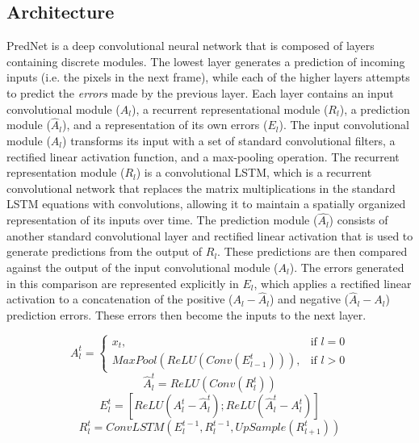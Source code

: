 \subsection{Architecture}

PredNet is a deep convolutional neural network that is composed of layers containing discrete modules. The lowest layer generates a prediction of incoming inputs (i.e. the pixels in the next frame), while each of the higher layers attempts to predict the {\em errors} made by the previous layer. Each layer contains an input convolutional module ($A_l$), a recurrent representational module ($R_l$), a prediction module ($\hat{A}_l$), and a representation of its own errors ($E_l$). The input convolutional module ($A_l$) transforms its input with a set of standard convolutional filters, a rectified linear activation function, and a max-pooling operation. The recurrent representation module ($R_l$) is a convolutional LSTM, which is a recurrent convolutional network that replaces the matrix multiplications in the standard LSTM equations with convolutions, allowing it to maintain a spatially organized representation of its inputs over time. The prediction module ($\hat{A_l}$) consists of another standard convolutional layer and rectified linear activation that is used to generate predictions from the output of $R_l$. These predictions are then compared against the output of the input convolutional module ($A_l$). The errors generated in this comparison are represented explicitly in $E_l$, which applies a rectified linear activation to a concatenation of the positive ($A_l - \hat{A}_l$) and negative ($\hat{A}_l - A_l$) prediction errors. These errors then become the inputs to the next layer. 

\begin{equation}
A_l^t = 
\begin{cases}
    x_t, & \text{if } l = 0\\
    MaxPool(ReLU(Conv(E_{l-1}^t))), & \text{if } l > 0
\end{cases}
\end{equation}
\begin{equation}
\hat{A}_l^t = ReLU(Conv(R_l^t))
\end{equation}
\begin{equation}
E_l^t = [ReLU(A_l^t - \hat{A}_l^t); ReLU(\hat{A}_l^t - A_l^t)]
\end{equation}
\begin{equation}
R_l^t = ConvLSTM(E_l^{t-1},R_l^{t-1},UpSample(R_{l+1}^t))
\end{equation}

